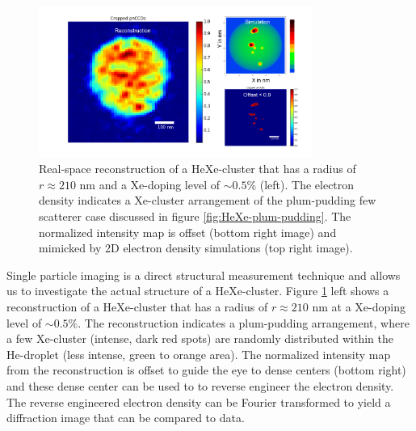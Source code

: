 \begin{figure}
 	\centering
 		\includegraphics[width=0.80\textwidth]{images/results/reconstructions-to-simulations.png}
 	\caption[Reconstruction of HeXe-cluster and simulated electron densities.]{Real-space reconstruction of a HeXe-cluster that has a radius of $r\approx 210$ nm and a Xe-doping level of $\sim 0.5\%$ (left). The electron density indicates a Xe-cluster arrangement of the plum-pudding few scatterer case discussed in figure \ref{fig:HeXe-plum-pudding}. The normalized intensity map is offset (bottom right image) and mimicked by 2D electron density simulations (top right image).}
 	\label{fig:HeXe-cluster-60}
\end{figure}
Single particle imaging is a direct structural measurement technique and allows us to investigate the actual structure of a HeXe-cluster. Figure \ref{fig:HeXe-cluster-60} left shows a reconstruction of a HeXe-cluster that has a radius of $r\approx 210$ nm at a Xe-doping level of $\sim 0.5 \%$. The reconstruction indicates a plum-pudding arrangement, where a few Xe-cluster (intense, dark red spots) are randomly distributed within the He-droplet (less intense, green to orange area). The normalized intensity map from the reconstruction is offset to guide the eye to dense centers (bottom right) and these dense center can be used to to reverse engineer the electron density. The reverse engineered electron density can be Fourier transformed to yield a diffraction image that can be compared to data.
%
%
%
%
%
%
